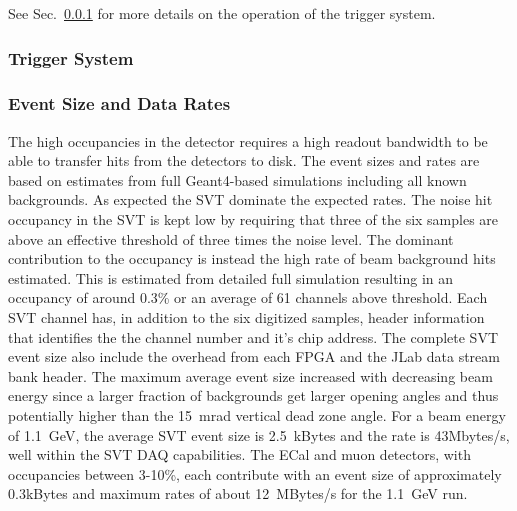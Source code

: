 See Sec.~\ref{sec:triggerdaq} for more details on the operation of the trigger system.


\subsubsection{Trigger System}
\label{sec:triggerdaq}


\subsubsection{Event Size and Data Rates}

The high occupancies in the detector requires a high readout bandwidth to be able to transfer hits from the 
detectors to disk. The event sizes and rates are based on estimates from full Geant4-based simulations 
including all known backgrounds. As expected the SVT dominate the expected rates. 
The noise hit occupancy in the SVT is kept low by requiring that three of the six samples are above an
effective threshold of three times the noise level. The dominant contribution to the occupancy is instead 
the high rate of beam background hits estimated. This is estimated 
from detailed full simulation resulting in an occupancy of around 0.3\% or an average of 61 channels above threshold.  
Each SVT channel has, in addition to the six digitized samples,  header information that identifies the 
the channel number and it's chip address. The complete SVT event size also 
include the overhead from each FPGA and the JLab data stream bank header.  
The maximum average event size increased with decreasing beam energy since a larger 
fraction of backgrounds get larger opening angles and thus potentially higher than the 15~mrad 
vertical dead zone angle. For a beam energy of 1.1~GeV, the average SVT event size is 2.5~kBytes and 
the rate is 43Mbytes/s, well within the SVT DAQ capabilities. 
The ECal and muon detectors, with occupancies between 3-10\%, each contribute with an event size of 
approximately 0.3kBytes and maximum rates of about 12~MBytes/s for the 1.1~GeV run. 
